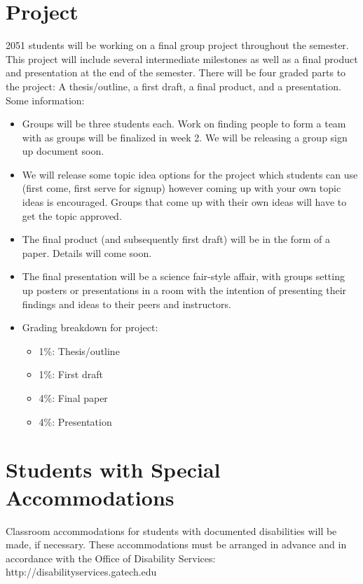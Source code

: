 \documentclass{article}
\begin{document}
\section{Project}
2051 students will be working on a final group project throughout the semester. This project will include several intermediate milestones as well as a final product and presentation at the end of the semester. There will be four graded parts to the project: A thesis/outline, a first draft, a final product, and a presentation. Some information:
\begin{itemize}
    \item Groups will be three students each. Work on finding people to form a team with as groups will be finalized in week 2. We will be releasing a group sign up document soon.
    \item We will release some topic idea options for the project which students can use (first come, first serve for signup) however coming up with your own topic ideas is encouraged. Groups that come up with their own ideas will have to get the topic approved.
    \item The final product (and subsequently first draft) will be in the form of a paper. Details will come soon.
    \item The final presentation will be a science fair-style affair, with groups setting up posters or presentations in a room with the intention of presenting their findings and ideas to their peers and instructors.
    \item Grading breakdown for project:
        \begin{itemize}
            \item 1\%: Thesis/outline
            \item 1\%: First draft
            \item 4\%: Final paper
            \item 4\%: Presentation
        \end{itemize}
\end{itemize}

\section{Students with Special Accommodations}
Classroom accommodations for students with documented disabilities will be made, if necessary. These accommodations must be arranged in advance and in accordance with the Office of Disability Services: http://disabilityservices.gatech.edu
\end{document}
